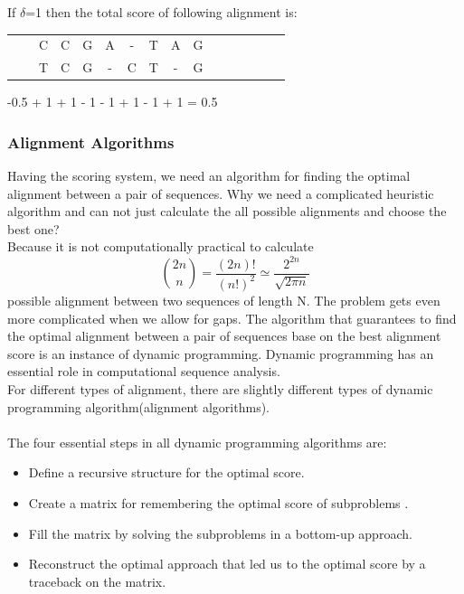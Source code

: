 \documentclass[11pt,a4paper]{report}
\begin{document}
If $\delta$=1 then the total score of following alignment is:
 
\begin{center}
	\begin{tabular}{c *{12}cccc}
        & & C & C & G & A & - & T & A & G && \\
 	  & & T  & C & G &  -  & C   &  T & -  & G & \\
    	                                 
	\end{tabular}
\end{center} 

-0.5 + 1 + 1 - 1 - 1 + 1 - 1 + 1 = 0.5

\subsubsection{Alignment Algorithms}

Having the scoring system, we need an algorithm for finding the optimal alignment 
between a pair of sequences. Why we need a complicated heuristic algorithm and can
not just calculate the all possible alignments and choose the best one?\\
Because it is not computationally practical to calculate  
$$ \binom{2n}{n} = \frac{(2n)!}{(n!)^2} \simeq \frac{2^{2n}}{\sqrt{2\pi n}} $$
possible alignment between two sequences of length N. The problem gets even more complicated when we allow for gaps. 
The algorithm that guarantees to find the optimal alignment between a pair of sequences base on the best alignment 
score is an instance of dynamic programming. 
Dynamic programming has an essential role in computational sequence analysis.\\ 
For different types of alignment, there are slightly different types of dynamic programming algorithm(alignment algorithms).\\\\

The four essential steps in all dynamic programming algorithms are:

\begin{itemize} 
	\item Define a recursive structure for the optimal score\cite{eddydynamic}.
	\item  Create a  matrix for remembering the optimal score of subproblems \cite{eddydynamic}.	
	\item Fill the matrix by solving the  subproblems in a bottom-up approach\cite{eddydynamic}.
	\item Reconstruct the optimal approach that led us to the optimal score by a traceback on the matrix\cite{eddydynamic}.
\end{itemize}
\end{document}

